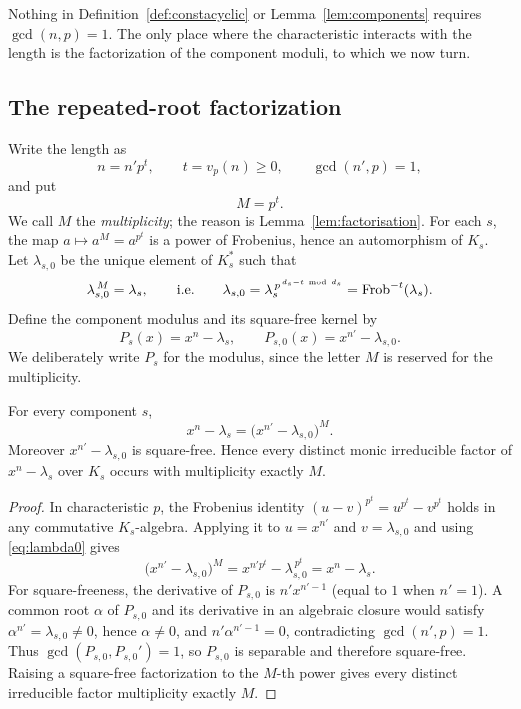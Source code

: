 Nothing in Definition~\ref{def:constacyclic} or Lemma~\ref{lem:components}
requires $\gcd(n,p)=1$.  The only place where the characteristic interacts with
the length is the factorization of the component moduli, to which we now turn.

\subsection{The repeated-root factorization}\label{sec:factorisation}

Write the length as
\[
n=n'p^t,\qquad t=v_p(n)\geq0,\qquad \gcd(n',p)=1,
\]
and put
\[
M=p^t .
\]
We call $M$ the \emph{multiplicity}; the reason is Lemma~\ref{lem:factorisation}.
For each $s$, the map $a\mapsto a^M=a^{p^t}$ is a power of Frobenius, hence an
automorphism of $K_s$.  Let $\lambda_{s,0}$ be the unique element of $K_s^\ast$
such that
\begin{equation}\label{eq:lambda0}
\lambda_{s,0}^{\,M}=\lambda_s,
\qquad\text{i.e.}\qquad
\lambda_{s,0}=\lambda_s^{\,p^{\,d_s-t\ \mathrm{mod}\ d_s}}=\Frob^{-t}(\lambda_s).
\end{equation}
Define the component modulus and its square-free kernel by
\[
P_s(x)=x^n-\lambda_s,\qquad P_{s,0}(x)=x^{n'}-\lambda_{s,0}.
\]
We deliberately write $P_s$ for the modulus, since the letter $M$ is reserved
for the multiplicity.

\begin{lemma}\label{lem:factorisation}
For every component $s$,
\begin{equation}\label{eq:factorisation}
x^n-\lambda_s=\bigl(x^{n'}-\lambda_{s,0}\bigr)^M .
\end{equation}
Moreover $x^{n'}-\lambda_{s,0}$ is square-free.  Hence every distinct monic
irreducible factor of $x^n-\lambda_s$ over $K_s$ occurs with multiplicity
exactly $M$.
\end{lemma}

\begin{proof}
In characteristic $p$, the Frobenius identity
$(u-v)^{p^t}=u^{p^t}-v^{p^t}$ holds in any commutative $K_s$-algebra.  Applying
it to $u=x^{n'}$ and $v=\lambda_{s,0}$ and using \eqref{eq:lambda0} gives
\[
\bigl(x^{n'}-\lambda_{s,0}\bigr)^M
   =x^{n'p^t}-\lambda_{s,0}^{\,p^t}=x^n-\lambda_s .
\]
For square-freeness, the derivative of $P_{s,0}$ is $n'x^{n'-1}$ (equal to $1$
when $n'=1$).  A common root $\alpha$ of $P_{s,0}$ and its derivative in an
algebraic closure would satisfy $\alpha^{n'}=\lambda_{s,0}\neq0$, hence
$\alpha\neq0$, and $n'\alpha^{n'-1}=0$, contradicting $\gcd(n',p)=1$.
Thus $\gcd(P_{s,0},P_{s,0}')=1$, so $P_{s,0}$ is separable and therefore
square-free.  Raising a square-free factorization to the $M$-th power gives
every distinct irreducible factor multiplicity exactly $M$.
\end{proof}

